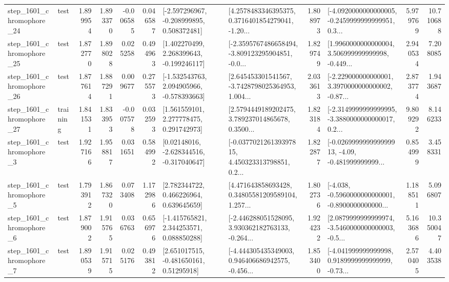 \begin{tabular}{llrrrrllrlrr}
 step\_1601\_chromophore\_24 &      test &      1.899954 &    1.893370 &     -0.006585 &  0.046587 &   [-2.597296967, -0.208999895, 0.508372481] &  [4.2578483346395375, 0.3716401854279041, -1.20... &       1.808973 &  [-4.0920000000000005, -0.2459999999999951, 0.3... &            5.979769 &         10.710688 \\
 step\_1601\_chromophore\_25 &      test &      1.872770 &    1.898028 &      0.025258 &  0.494963 &    [1.402270499, 2.268399643, -0.199246117] &  [-2.3595767486658494, -3.809123295904851, -0.0... &       1.829749 &  [1.9960000000000004, 3.506999999999998, -0.449... &            2.940534 &          7.208085 \\
 step\_1601\_chromophore\_26 &      test &      1.877614 &    1.887291 &      0.009677 &  0.275573 &   [-1.532543763, 2.094905966, -0.578393663] &  [2.645453301541567, -3.7428798025364953, 1.004... &       2.033613 &  [-2.229000000000001, 3.3970000000000002, -0.87... &            2.873774 &          1.943687 \\
 step\_1601\_chromophore\_27 &  training &      1.841531 &    1.833953 &     -0.007578 &  0.032593 &     [1.561559101, 2.277778475, 0.291742973] &  [2.5794449189202475, 3.789237014865678, 0.3500... &       1.823184 &  [-2.3149999999999995, -3.3880000000000017, 0.2... &            9.809292 &          8.146233 \\
  step\_1601\_chromophore\_3 &      test &      1.927166 &    1.958817 &      0.031651 &  0.584992 &    [0.02148016, -2.628344516, -0.317040647] &  [-0.037702126139397815, 4.450323313798851, 0.2... &       1.822877 &  [-0.026999999999999913, -4.09, -0.481999999999... &            0.854999 &          3.458331 \\
  step\_1601\_chromophore\_5 &      test &      1.793912 &    1.867320 &      0.073408 &  1.172986 &     [2.782344722, 0.466226964, 0.639645659] &  [4.471643858693428, 0.34805581209589104, 1.257... &       1.802736 &  [-4.038, -0.5960000000000001, -0.8900000000000... &            1.188511 &          5.096807 \\
  step\_1601\_chromophore\_6 &      test &      1.879002 &    1.915765 &      0.036763 &  0.656976 &    [-1.415765821, 2.344253571, 0.088850288] &  [-2.446288051528095, 3.930362182763133, -0.264... &       1.924232 &  [2.0879999999999974, -3.5460000000000003, -0.5... &            5.163686 &         10.350047 \\
  step\_1601\_chromophore\_7 &      test &      1.890539 &    1.915715 &      0.025176 &  0.493812 &     [2.651017515, -0.481650161, 0.51295918] &  [-4.444305435349003, 0.946406686942575, -0.456... &       1.853400 &  [-4.041999999999998, 0.9189999999999999, -0.73... &            2.570405 &          4.403538 \\

\end{tabular}
